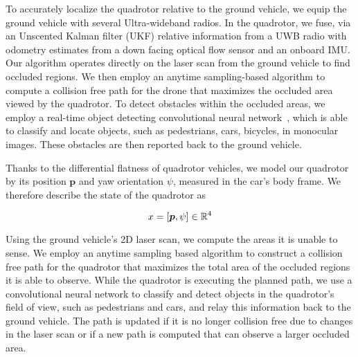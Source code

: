 
To accurately localize the quadrotor relative to the ground vehicle, we equip the ground vehicle with several Ultra-wideband radios. In the quadrotor, we fuse, via an Unscented Kalman filter (UKF) relative information from a UWB radio with odometry estimates from a down facing optical flow sensor and an onboard IMU.
Our algorithm operates directly on the laser scan from the ground vehicle to find occluded
regions.
We then employ an anytime sampling-based algorithm to compute a collision free path for the drone
that maximizes the occluded area viewed by the quadrotor.
To detect obstacles within the occluded areas, we employ a real-time object detecting convolutional neural network~\cite{yolo}, which is able to classify and locate objects, such as pedestrians, cars, bicycles, in monocular images. These obstacles are then reported back to the ground vehicle.



Thanks to the differential flatness of quadrotor vehicles, we model our quadrotor by its position $\bm{p}$ and yaw orientation $\psi$, measured in the car's body frame. We therefore describe the state of the quadrotor as

$$
    x = [\bm{p}, \psi] \in \mathbb{R}^4
$$

Using the ground vehicle's 2D laser scan, we compute the areas it is unable to
sense. We employ an anytime sampling based algorithm to construct a collision
free path for the quadrotor that maximizes the total area of the occluded
regions it is able to observe. While the quadrotor is executing the planned
path, we use a convolutional neural network to classify and detect objects in
the quadrotor's field of view, such as pedestrians and cars, and relay this
information back to the ground vehicle. The path is updated if it is no longer
collision free due to changes in the laser scan or if a new path is computed
that can observe a larger occluded area.

